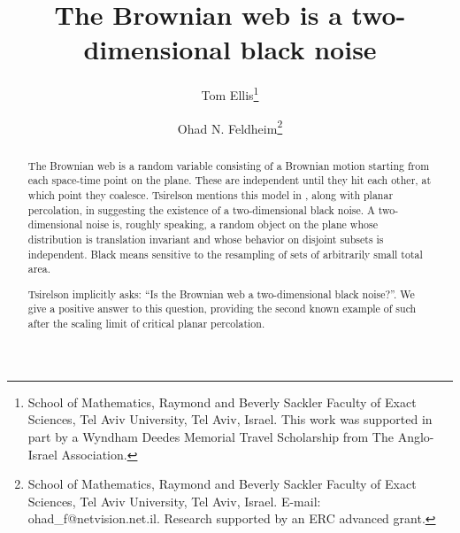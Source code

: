 \newcommand{\sigfield}{$\sigma$-field}
{
\title{The Brownian web is a two-dimensional black noise}

\newcommand{\tomthanks}{School of Mathematics, Raymond and Beverly Sackler Faculty of Exact
Sciences, Tel Aviv University, Tel Aviv, Israel.  This work was supported in part by
a Wyndham Deedes Memorial Travel Scholarship from The Anglo-Israel
Association.}

\newcommand{\ohadthanks}{School of Mathematics, Raymond and Beverly Sackler Faculty of Exact
Sciences, Tel Aviv University, Tel Aviv, Israel. E-mail:
ohad\_f@netvision.net.il. Research supported by an ERC advanced grant.}

\author{Tom Ellis\thanks{\tomthanks}\\%
\and Ohad N. Feldheim\thanks{\ohadthanks}}


\maketitle

\begin{abstract}
The Brownian web is a random variable consisting of a Brownian motion
starting from each space-time point on the plane.  These are
independent until they hit each other, at which point they coalesce.
Tsirelson mentions this model in
\cite{tsirelson-scaling-limit-noise-stability}, along with planar
percolation, in suggesting the existence of a two-dimensional black
noise.
A two-dimensional noise is, roughly speaking, a random object on the plane whose
distribution is translation invariant and whose behavior on disjoint
subsets is independent.  Black means sensitive to the resampling of
sets of arbitrarily small total area.

Tsirelson implicitly asks: ``Is the
Brownian web a two-dimensional black noise?''.  We give a positive
answer to this question, providing the second known example of such
after the scaling limit of critical planar percolation.

\let\thefootnote\relax{}
\let\thefootnote\relax{}
\end{abstract}

}
